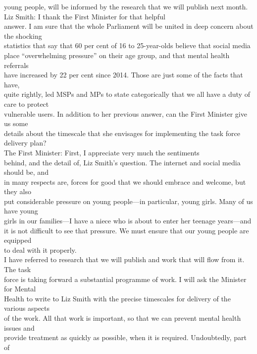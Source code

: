 \documentclass{article}
\begin{document}
\begin{description}
{young people, will be informed by the research that we will publish next month.\\
Liz Smith: I thank the First Minister for that helpful\\
answer. I am sure that the whole Parliament will be united in deep concern about the shocking\\
statistics that say that 60 per cent of 16 to 25-year-olds believe that social media\\
place “overwhelming pressure” on their age group, and that mental health referrals\\
have increased by 22 per cent since 2014. Those are just some of the facts that have,\\
quite rightly, led MSPs and MPs to state categorically that we all have a duty of care to protect\\
vulnerable users. In addition to her previous answer, can the First Minister give us some\\
details about the timescale that she envisages for implementing the task force delivery plan?\\
The First Minister: First, I appreciate very much the sentiments\\
behind, and the detail of, Liz Smith’s question. The internet and social media should be, and\\
in many respects are, forces for good that we should embrace and welcome, but they also\\
put considerable pressure on young people—in particular, young girls. Many of us have young\\
girls in our families—I have a niece who is about to enter her teenage years—and\\
it is not difficult to see that pressure. We must ensure that our young people are equipped\\
to deal with it properly.\\
I have referred to research that we will publish and work that will flow from it. The task\\
force is taking forward a substantial programme of work. I will ask the Minister for Mental\\
Health to write to Liz Smith with the precise timescales for delivery of the various aspects\\
of the work. All that work is important, so that we can prevent mental health issues and\\
provide treatment as quickly as possible, when it is required. Undoubtedly, part of\\
}
\end{description}
\end{document}
